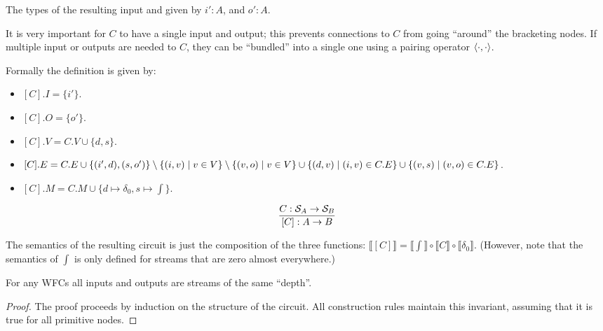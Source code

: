 The types of the resulting input and given by $i': A$, and $o': A$.

It is very important for $C$ to have a single input and output; this prevents
connections to $C$ from going ``around'' the bracketing nodes.  If multiple 
input or outputs are needed to $C$, they can be ``bundled'' into a single one using a
pairing operator $\langle \cdot,\cdot \rangle$.

Formally the definition is given by:

\begin{itemize}
\item $[C].I = \{ i' \}$.
\item $[C].O = \{ o' \}$.
\item $[C].V = C.V \cup \{ d, s \}$.
\item $[C].E = C.E \cup \{ (i', d), (s, o') \} \setminus \{ (i,v) \;|\; v \in V \} \setminus \{ (v, o) \;|\; v \in V \}
  \cup \{ (d, v) \;|\; (i, v) \in C.E \} \cup \{ (v, s) \;|\; (v, o) \in C.E \}$.
\item $[C].M = C.M \cup \{ d \mapsto \delta_0, s \mapsto \int \}$.
\end{itemize}
$$
\frac{
C: \mathcal{S}_{A} \rightarrow \mathcal{S}_{B}
}{
[C]: A \rightarrow B
}$$

The semantics of the resulting circuit is just the composition of the three functions:
$\llbracket [C] \rrbracket = \llbracket \int \rrbracket \circ \llbracket C \rrbracket \circ \llbracket \delta_0 \rrbracket$.
(However, note that the semantics of $\int$ is only defined for streams that are zero almost everywhere.)

\begin{theorem}
For any WFCs all inputs and outputs are streams of the same ``depth''.
\end{theorem}
\begin{proof}
The proof proceeds by induction on the structure of the circuit.
All construction rules maintain this invariant, assuming that it is true for all primitive nodes.
\end{proof}

\begin{comment}
\subsection{Circuit equivalence}

\begin{theorem}
Given two WFCs $C$ and $D$, with the same semantics $\llbracket C \rrbracket = \llbracket D \rrbracket$,
(which requires them to have the same type $I \rightarrow O$) and a context $H$ with a ``hole'' of a 
type $I \rightarrow O$ such that $H[C]$ and $H[D]$ are WFC, then $\llbracket H[C] \rrbracket = \llbracket H[D] \rrbracket$.
\end{theorem}
\end{comment}


